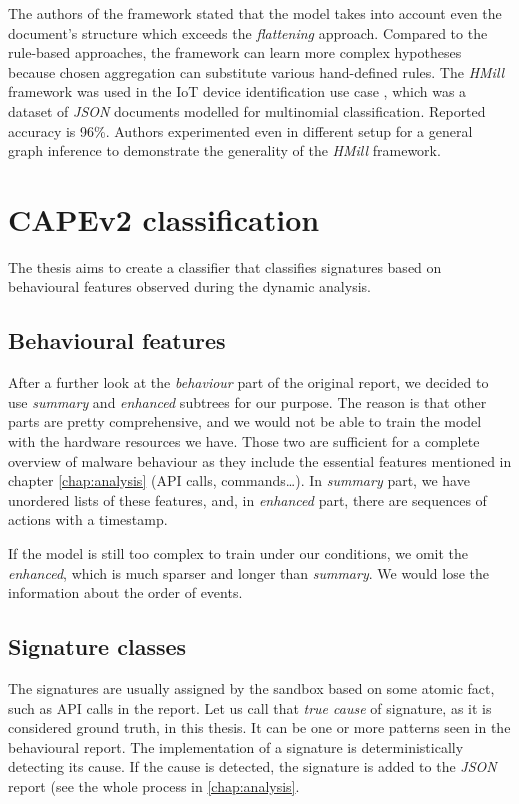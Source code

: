 The authors of the framework stated that the model takes into account even the document's structure which exceeds the \emph{flattening} approach. Compared to the rule-based approaches, the framework can learn more complex hypotheses because chosen aggregation can substitute various hand-defined rules. The \emph{HMill} framework was used in the IoT device identification use case \cite{Mandlik2020}, which was a dataset of \emph{JSON} documents modelled for multinomial classification. Reported accuracy is 96\%. Authors experimented even in different setup for a general graph inference to demonstrate the generality of the \emph{HMill} framework.


\section{CAPEv2 classification}
The thesis aims to create a classifier that classifies signatures based on behavioural features observed during the dynamic analysis.

\subsection{Behavioural features}
After a further look at the \emph{behaviour} part of the original report, we decided to use \emph{summary} and \emph{enhanced} subtrees for our purpose. The reason is that other parts are pretty comprehensive, and we would not be able to train the model with the hardware resources we have. Those two are sufficient for a complete overview of malware behaviour as they include the essential features mentioned in chapter \ref{chap:analysis} (API calls, commands\dots). In \emph{summary} part, we have unordered lists of these features, and, in \emph{enhanced} part, there are sequences of actions with a timestamp.

If the model is still too complex to train under our conditions, we omit the \emph{enhanced}, which is much sparser and longer than \emph{summary}. We would lose the information about the order of events.

\subsection{Signature classes}
The signatures are usually assigned by the sandbox based on some atomic fact, such as API calls in the report. Let us call that \emph{true cause} of signature, as it is considered ground truth, in this thesis. It can be one or more patterns seen in the behavioural report. The implementation of a signature is deterministically detecting its cause. If the cause is detected, the signature is added to the \emph{JSON} report (see the whole process in \ref{chap:analysis}.


